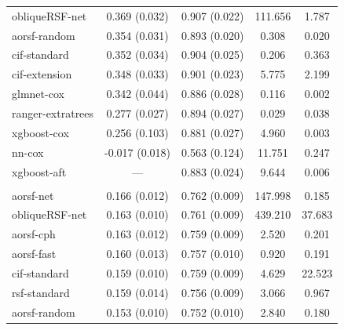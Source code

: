 \documentclass{article}\usepackage[]{graphicx}\usepackage[]{xcolor}
\newenvironment{knitrout}{}{} %
\begin{document}
\begin{knitrout}
\begin{longtable}[t]{lcccc}
\hspace{1em}obliqueRSF-net & 0.369 (0.032) & 0.907 (0.022) & 111.656 & 1.787\\
\hspace{1em}aorsf-random & 0.354 (0.031) & 0.893 (0.020) & 0.308 & 0.020\\
\hspace{1em}cif-standard & 0.352 (0.034) & 0.904 (0.025) & 0.206 & 0.363\\
\hspace{1em}cif-extension & 0.348 (0.033) & 0.901 (0.023) & 5.775 & 2.199\\
\hspace{1em}glmnet-cox & 0.342 (0.044) & 0.886 (0.028) & 0.116 & 0.002\\
\hspace{1em}ranger-extratrees & 0.277 (0.027) & 0.894 (0.027) & 0.029 & 0.038\\
\hspace{1em}xgboost-cox & 0.256 (0.103) & 0.881 (0.027) & 4.960 & 0.003\\
\hspace{1em}nn-cox & -0.017 (0.018) & 0.563 (0.124) & 11.751 & 0.247\\
\hspace{1em}xgboost-aft & --- & 0.883 (0.024) & 9.644 & 0.006\\
\addlinespace[0.3em]
\multicolumn{5}{l}{\textit{\textbf{Rotterdam tumor bank; death, n = 2982, p = 11}}}\\
\hline
\hspace{1em}aorsf-net & 0.166 (0.012) & 0.762 (0.009) & 147.998 & 0.185\\
\hspace{1em}obliqueRSF-net & 0.163 (0.010) & 0.761 (0.009) & 439.210 & 37.683\\
\hspace{1em}aorsf-cph & 0.163 (0.012) & 0.759 (0.009) & 2.520 & 0.201\\
\hspace{1em}aorsf-fast & 0.160 (0.013) & 0.757 (0.010) & 0.920 & 0.191\\
\hspace{1em}cif-standard & 0.159 (0.010) & 0.759 (0.009) & 4.629 & 22.523\\
\hspace{1em}rsf-standard & 0.159 (0.014) & 0.756 (0.009) & 3.066 & 0.967\\
\hspace{1em}aorsf-random & 0.153 (0.010) & 0.752 (0.010) & 2.840 & 0.180\\

\end{longtable}
\end{knitrout}
\end{document}
